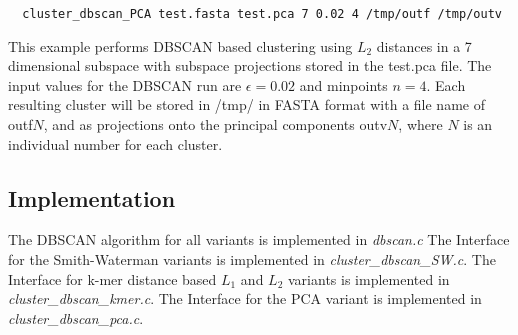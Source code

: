 \begin{lstlisting}
  cluster_dbscan_PCA test.fasta test.pca 7 0.02 4 /tmp/outf /tmp/outv
\end{lstlisting}
This example performs DBSCAN based clustering using $L_2$ distances in
a 7 dimensional subspace with subspace projections stored in the
test.pca file. The input values for the DBSCAN run are $\epsilon=0.02$
and minpoints $n=4$. Each resulting cluster will be stored in /tmp/
in FASTA format with a file name of outf$N$, and as projections
onto the principal components outv$N$, where $N$ is an individual
number for each cluster. 

\subsection{Implementation}

The DBSCAN algorithm for all variants is implemented in \emph{dbscan.c}
The Interface for the Smith-Waterman variants is implemented in
\emph{cluster\_dbscan\_SW.c}.
The Interface for k-mer distance based $L_1$ and $L_2$ variants is
implemented in \emph{cluster\_dbscan\_kmer.c}.
The Interface for the PCA variant is implemented in
\emph{cluster\_dbscan\_pca.c}.









    
